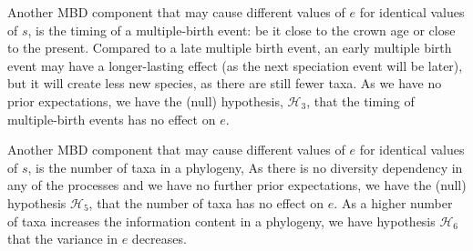 \begin{itemize}
Another MBD component that may cause 
different values of $e$ for identical values of $s$,
is the timing of a multiple-birth event: be it close to the
crown age or close to the present. 
Compared to a late multiple birth event, an early multiple birth event may have a 
longer-lasting effect (as the next speciation event will be later), but it
will create less new species, as there are still fewer taxa.
As we have no prior expectations,
we have the (null) hypothesis, 
$\mathcal{H}_3$, that the timing of multiple-birth events has no effect on $e$.



Another MBD component that may cause 
different values of $e$ for identical values of $s$,
is the number of taxa in a phylogeny,
As there is no diversity dependency in any of the processes
and we have no further prior expectations, we have
the (null) hypothesis $\mathcal{H}_5$, that the number of
taxa has no effect on $e$.
As a higher number of taxa increases the information content in a
phylogeny, we have hypothesis $\mathcal{H}_6$ that the
variance in $e$ decreases.





\end{itemize}